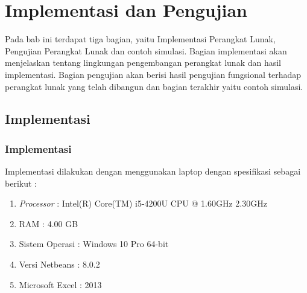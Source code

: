 \chapter{Implementasi dan Pengujian}
\label{chap:implementasi}

Pada bab ini terdapat tiga bagian, yaitu Implementasi Perangkat Lunak, Pengujian Perangkat Lunak dan contoh simulasi. Bagian implementasi akan menjelaskan tentang lingkungan pengembangan perangkat lunak dan hasil implementasi. Bagian pengujian akan berisi hasil pengujian fungsional terhadap perangkat lunak yang telah dibangun dan bagian terakhir yaitu contoh simulasi.

\section{Implementasi}
\label{sec:implementasi}

\subsection{Implementasi}
Implementasi dilakukan dengan menggunakan laptop dengan spesifikasi sebagai berikut :
\begin{enumerate}
	\item \textit{Processor} : Intel(R) Core(TM) i5-4200U CPU @ 1.60GHz 2.30GHz
	\item RAM : 4.00 GB
	\item Sistem Operasi : Windows 10 Pro 64-bit
	\item Versi Netbeans : 8.0.2
	\item Microsoft Excel : 2013
\end{enumerate}

